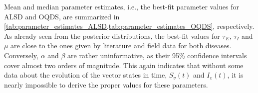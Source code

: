 Mean and median parameter estimates, i.e., the best-fit parameter values for
ALSD and OQDS, are summarized in
\cref{tab:parameter_estimates_ALSD,tab:parameter_estimates_OQDS}, respectively.
As already seen from the posterior distributions, the best-fit values for
$\tau_E$, $\tau_I$ and $\mu$ are close to the ones given by literature and
field data for both diseases. Conversely, $\alpha$ and $\beta$ are rather
uninformative, as their 95\% confidence intervals cover almost two orders of
magnitude. This again indicates that without some data about the evolution of
the vector states in time, $S_v(t)$ and $I_v(t)$, it is nearly impossible to
derive the proper values for these parameters.

\begin{table}[H]
    \centering
    \caption[Estimated parameters of the model for ALSD in Mallorca]{Estimated
        epidemiological
        parameters from Bayesian model
        fitting to the disease progression curve of ALSD in Mallorca.}
    \label{tab:parameter_estimates_ALSD}
\end{table}

